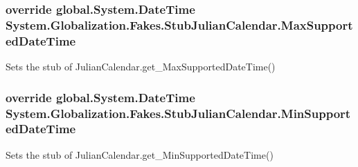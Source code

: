 \hypertarget{class_system_1_1_globalization_1_1_fakes_1_1_stub_julian_calendar_a70e40ae4e6ca7e62102aaa5aa5923f82}{
\subsubsection[{Max\-Supported\-Date\-Time}]{\setlength{\rightskip}{0pt plus 5cm}override global.\-System.\-Date\-Time System.\-Globalization.\-Fakes.\-Stub\-Julian\-Calendar.\-Max\-Supported\-Date\-Time\hspace{0.3cm}{\ttfamily [get]}}}\label{class_system_1_1_globalization_1_1_fakes_1_1_stub_julian_calendar_a70e40ae4e6ca7e62102aaa5aa5923f82}


Sets the stub of Julian\-Calendar.\-get\-\_\-\-Max\-Supported\-Date\-Time()

\hypertarget{class_system_1_1_globalization_1_1_fakes_1_1_stub_julian_calendar_a732ce34a6be92b88d7da4663aa960dfe}{
\subsubsection[{Min\-Supported\-Date\-Time}]{\setlength{\rightskip}{0pt plus 5cm}override global.\-System.\-Date\-Time System.\-Globalization.\-Fakes.\-Stub\-Julian\-Calendar.\-Min\-Supported\-Date\-Time\hspace{0.3cm}{\ttfamily [get]}}}\label{class_system_1_1_globalization_1_1_fakes_1_1_stub_julian_calendar_a732ce34a6be92b88d7da4663aa960dfe}


Sets the stub of Julian\-Calendar.\-get\-\_\-\-Min\-Supported\-Date\-Time()

